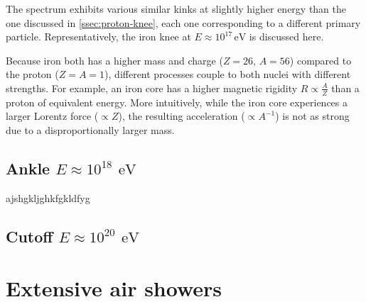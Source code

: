 The spectrum exhibits various similar kinks at slightly higher energy than the one discussed in \autoref{ssec:proton-knee}, each one corresponding to a different 
primary particle. Representatively, the iron knee at $E \approx 10^{17}\,\text{eV}$ is discussed here. 

Because iron both has a higher mass and charge ($Z = 26$, $A = 56$) compared to the proton ($Z = A = 1$), different processes couple to both nuclei with 
different strengths. For example, an iron core has a higher magnetic rigidity $R \propto \frac{A}{Z}$ than a proton of equivalent energy. More intuitively, while 
the iron core experiences a larger Lorentz force ($\propto Z$), the resulting acceleration ($\propto A^{-1}$) is not as strong due to a disproportionally larger 
mass.

\subsection{Ankle $E \approx 10^{18}\,\SI{}{\electronvolt}$}
\label{ssec:cr-ankle}

ajshgkljghkfgkldfyg

\subsection{Cutoff $E \approx 10^{20}\,\SI{}{\electronvolt}$}


\section{Extensive air showers}
\label{sec:extensive-air-showers}




